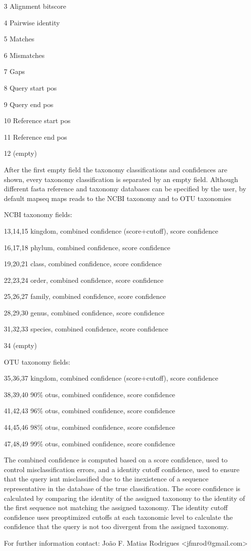 \documentclass[10pt,a4paper]{article}
\begin{document}
3       Alignment bitscore

4       Pairwise identity

5       Matches

6       Mismatches

7       Gaps

8       Query start pos

9       Query end pos

10      Reference start pos

11      Reference end pos

12      (empty)

After the first empty field the taxonomy classifications and confidences are shown, every taxonomy classification is separated by an empty field.
Although different fasta reference and taxonomy databases can be specified by the user, by default mapseq maps reads to the NCBI taxonomy and to OTU taxonomies

NCBI taxonomy fields:

13,14,15        kingdom, combined confidence (score+cutoff), score confidence

16,17,18        phylum, combined confidence, score confidence

19,20,21        class, combined confidence, score confidence

22,23,24        order, combined confidence, score confidence

25,26,27        family, combined confidence, score confidence

28,29,30        genus, combined confidence, score confidence

31,32,33        species, combined confidence, score confidence

34      (empty)

OTU taxonomy fields:

35,36,37        kingdom, combined confidence (score+cutoff), score confidence

38,39,40        90\% otus, combined confidence, score confidence

41,42,43        96\% otus, combined confidence, score confidence

44,45,46        98\% otus, combined confidence, score confidence

47,48,49        99\% otus, combined confidence, score confidence

The combined confidence is computed based on a score confidence, used to control misclassification errors, and a identity cutoff confidence, used to ensure that the query isnt misclassified due to the inexistence of a sequence representative in the database of the true classification. The score confidence is
calculated by comparing the identity of the assigned taxonomy to the identity of the first sequence not matching the assigned taxonomy.
The identity cutoff confidence uses preoptimized cutoffs at each taxonomic level to calculate the confidence that the query is not too divergent from the assigned taxonomy.


For further information contact: Jo\~ao F. Matias Rodrigues {\textless}jfmrod@gmail.com\textgreater
\end{document}
